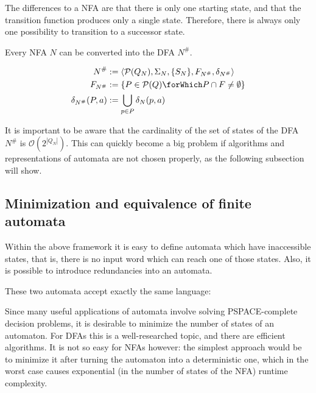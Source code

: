 The differences to a NFA are that there is only one starting state, and that
the transition function produces only a single state.
Therefore, there is always only one possibility to transition to a successor
state.

\begin{definition}
  Every NFA $N$ can be converted into the DFA $N^\#$.

  \begin{align*}
    N^\# &:= \langle \mathcal{P}(Q_N), \Sigma_N, \{ S_N \}, F_{N^\#}, \delta_{N^\#} \rangle\\
    F_{N^\#} &:= \{ P \in \mathcal{P}(Q) \forWhich P \cap F \neq \emptyset \}\\
    \delta_{N^\#}(P, a) &:= \bigcup_{p \in P} \delta_N(p, a)
  \end{align*}
\end{definition}

It is important to be aware that the cardinality of the set of states of the DFA
$N^\#$ is $\mathcal{O}(2^{|Q_N|})$.
This can quickly become a big problem if algorithms and representations of
automata are not chosen properly, as the following subsection will show.

\subsection{Minimization and equivalence of finite automata}

Within the above framework it is easy to define automata which have inaccessible
states, that is, there is no input word which can reach one of those states.
Also, it is possible to introduce redundancies into an automata.

\begin{example}
  These two automata accept exactly the same language:\\
  \center
\end{example}

Since many useful applications of automata involve solving PSPACE-complete
decision problems, it is desirable to minimize the number of states of an
automaton.
For DFAs this is a well-researched topic, and there are efficient algorithms.
It is not so easy for NFAs however: the simplest approach would be to
minimize it after turning the automaton into a deterministic one, which in the
worst case causes exponential (in the number of states of the NFA)
runtime complexity.

